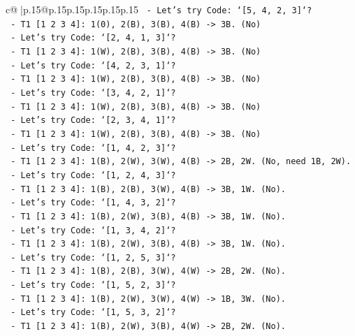\documentclass{article}
\begin{document}
{\begin{supertabular}{c@{$\;$}|p{.15\linewidth}@{}p{.15\linewidth}p{.15\linewidth}p{.15\linewidth}p{.15\linewidth}p{.15\linewidth}}
{{{\texttt{    {-} Let's try Code: `{[}5, 4, 2, 3{]}`?} \\
\texttt{        {-} T1 {[}1 2 3 4{]}: 1(0), 2(B), 3(B), 4(B) {-}> 3B. (No)} \\
\texttt{    {-} Let's try Code: `{[}2, 4, 1, 3{]}`?} \\
\texttt{        {-} T1 {[}1 2 3 4{]}: 1(W), 2(B), 3(B), 4(B) {-}> 3B. (No)} \\
\texttt{    {-} Let's try Code: `{[}4, 2, 3, 1{]}`?} \\
\texttt{        {-} T1 {[}1 2 3 4{]}: 1(W), 2(B), 3(B), 4(B) {-}> 3B. (No)} \\
\texttt{    {-} Let's try Code: `{[}3, 4, 2, 1{]}`?} \\
\texttt{        {-} T1 {[}1 2 3 4{]}: 1(W), 2(B), 3(B), 4(B) {-}> 3B. (No)} \\
\texttt{    {-} Let's try Code: `{[}2, 3, 4, 1{]}`?} \\
\texttt{        {-} T1 {[}1 2 3 4{]}: 1(W), 2(B), 3(B), 4(B) {-}> 3B. (No)} \\
\texttt{    {-} Let's try Code: `{[}1, 4, 2, 3{]}`?} \\
\texttt{        {-} T1 {[}1 2 3 4{]}: 1(B), 2(W), 3(W), 4(B) {-}> 2B, 2W. (No, need 1B, 2W).} \\
\texttt{    {-} Let's try Code: `{[}1, 2, 4, 3{]}`?} \\
\texttt{        {-} T1 {[}1 2 3 4{]}: 1(B), 2(B), 3(W), 4(B) {-}> 3B, 1W. (No).} \\
\texttt{    {-} Let's try Code: `{[}1, 4, 3, 2{]}`?} \\
\texttt{        {-} T1 {[}1 2 3 4{]}: 1(B), 2(W), 3(B), 4(B) {-}> 3B, 1W. (No).} \\
\texttt{    {-} Let's try Code: `{[}1, 3, 4, 2{]}`?} \\
\texttt{        {-} T1 {[}1 2 3 4{]}: 1(B), 2(W), 3(B), 4(B) {-}> 3B, 1W. (No).} \\
\texttt{    {-} Let's try Code: `{[}1, 2, 5, 3{]}`?} \\
\texttt{        {-} T1 {[}1 2 3 4{]}: 1(B), 2(B), 3(W), 4(W) {-}> 2B, 2W. (No).} \\
\texttt{    {-} Let's try Code: `{[}1, 5, 2, 3{]}`?} \\
\texttt{        {-} T1 {[}1 2 3 4{]}: 1(B), 2(W), 3(W), 4(W) {-}> 1B, 3W. (No).} \\
\texttt{    {-} Let's try Code: `{[}1, 5, 3, 2{]}`?} \\
\texttt{        {-} T1 {[}1 2 3 4{]}: 1(B), 2(W), 3(B), 4(W) {-}> 2B, 2W. (No).} \\
}}}
\end{supertabular}}
\end{document}
